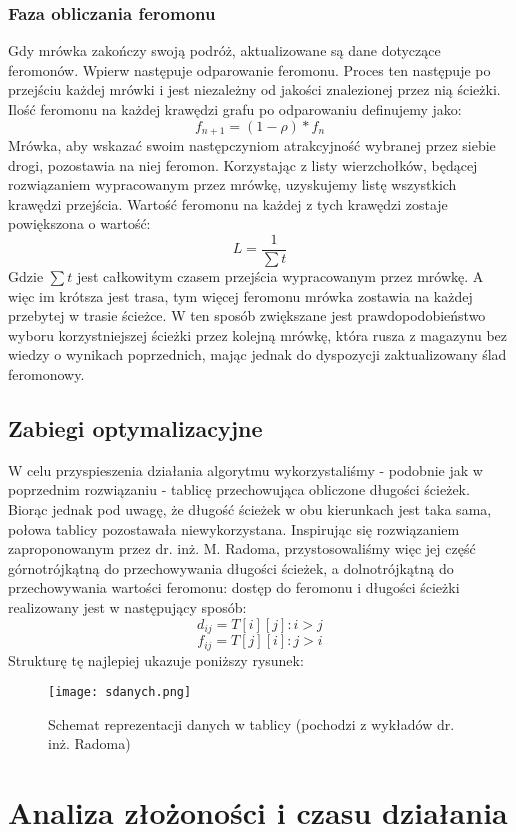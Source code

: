 \documentclass[a4paper]{article}
\begin{document}
\subsubsection{Faza obliczania feromonu}
Gdy mrówka zakończy swoją podróż, aktualizowane są dane dotyczące feromonów. Wpierw następuje odparowanie feromonu. Proces ten następuje po przejściu każdej mrówki i jest niezależny od jakości znalezionej przez nią ścieżki. Ilość feromonu na każdej krawędzi grafu po odparowaniu definujemy jako: $$f_{n+1} = (1-\rho)*f_n $$
Mrówka, aby wskazać swoim następczyniom atrakcyjność wybranej przez siebie drogi, pozostawia na niej feromon. Korzystając z listy wierzchołków, będącej rozwiązaniem wypracowanym przez mrówkę, uzyskujemy listę wszystkich krawędzi przejścia. Wartość feromonu na każdej z tych krawędzi zostaje powiększona o wartość: $$ L = \frac{1}{\sum t} $$ Gdzie $\sum t$ jest całkowitym czasem przejścia wypracowanym przez mrówkę. A więc im krótsza jest trasa, tym więcej feromonu mrówka zostawia na każdej przebytej w trasie ścieżce. W ten sposób zwiększane jest prawdopodobieństwo wyboru korzystniejszej ścieżki przez kolejną mrówkę, która rusza z magazynu bez wiedzy o wynikach poprzednich, mając jednak do dyspozycji zaktualizowany ślad feromonowy.

\subsection{Zabiegi optymalizacyjne}
W celu przyspieszenia działania algorytmu wykorzystaliśmy - podobnie jak w poprzednim rozwiązaniu\cite{poprzednie} - tablicę przechowująca obliczone długości ścieżek. Biorąc jednak pod uwagę, że długość ścieżek w obu kierunkach jest taka sama, połowa tablicy pozostawała niewykorzystana. Inspirując się rozwiązaniem zaproponowanym przez dr. inż. M. Radoma\cite{radom}, przystosowaliśmy więc jej część górnotrójkątną do przechowywania długości ścieżek, a dolnotrójkątną do przechowywania wartości feromonu: dostęp do feromonu i długości ścieżki realizowany jest w następujący sposób: 
$$ d_{ij} = T[i][j] : i > j $$
$$ f_{ij} = T[j][i] : j > i $$
Strukturę tę najlepiej ukazuje poniższy rysunek:
\begin{figure}[h]
\begin{center}
\texttt{[image: sdanych.png]}
\end{center}
\caption{Schemat reprezentacji danych w tablicy (pochodzi z wykładów dr. inż. Radoma)\cite{radom}}
\end{figure}
\newpage
\section{Analiza złożoności i czasu działania}
\end{document}
